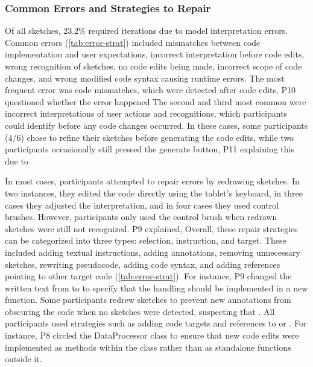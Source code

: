 \subsubsection{Common Errors and Strategies to Repair}
Of all sketches, $23.2\%$ required iterations due to model interpretation errors.
Common errors (\autoref{tab:error-strat}) included mismatches between code implementation and user expectations, incorrect interpretation before code edits, wrong recognition of sketches, no code edits being made, incorrect scope of code changes, and wrong modified code syntax causing runtime errors.
The most frequent error was code mismatches, which were detected after code edits, P10 questioned whether the error happened 
The second and third most common were incorrect interpretations of user actions and recognitions, which participants could identify before any code changes occurred. In these cases, some participants (4/6) chose to refine their sketches before generating the code edits, while two participants occasionally still pressed the generate button, P11 explaining this due to 


In most cases, participants attempted to repair errors by redrawing sketches. In two instances, they edited the code directly using the tablet's keyboard, in three cases they adjusted the interpretation, and in four cases they used control brushes. However, participants only used the control brush when redrawn sketches were still not recognized. P9 explained, 
Overall, these repair strategies can be categorized into three types: selection, instruction, and target. These included adding textual instructions, adding annotations, removing unnecessary sketches, rewriting pseudocode, adding code syntax, and adding references pointing to other target code (\autoref{tab:error-strat}).
For instance, P9 changed the written text from  to  to specify that the handling should be implemented in a new function. 
Some participants redrew sketches to prevent new annotations from obscuring the code when no sketches were detected, suspecting that . 
All participants used strategies such as adding code targets and references to  or .
For instance, P8 circled the DataProcessor class to ensure that new code edits were implemented as methods within the class rather than as standalone functions outside it.



